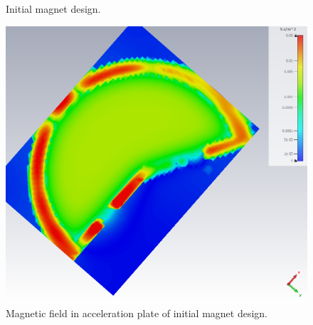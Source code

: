\documentclass[a4paper,oneside,12pt]{report}
\numberwithin{equation}{chapter}
\begin{document}
\vspace{18pt}
\begin{figure}[H]
    \centering
    \qquad{}%
    \vspace{0pt}
    \caption{\centering Initial magnet design.} 
    \label{fig:initial_magnet_design}
\end{figure}

\begin{figure}[H]
    \centering
    \includegraphics[width=.7\linewidth]{./figures/cst/cst_first_magnet_design3.png}
    \vspace{0pt}
    \caption{Magnetic field in acceleration plate of initial magnet design.}
    \label{fig:initial_magnet_design_B}
    \vspace{-10pt}
\end{figure}
\end{document}
